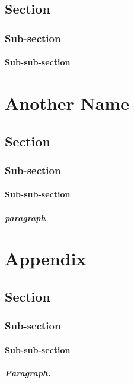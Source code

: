 \documentclass{thesis}
\begin{document}
\section{Section}
\subsection{Sub-section}
\subsubsection{Sub-sub-section}

\chapter{Another Name}
\lipsum[1-2]
\section{Section}
\lipsum[1]
\subsection{Sub-section}
\lipsum[5]
\subsubsection{Sub-sub-section}
\lipsum[1]
\paragraph{paragraph}
\lipsum[1]



\appendix %

\chapter{Appendix}
\section{Section}
\lipsum[1]
\subsection{Sub-section}
\lipsum[5]
\subsubsection{Sub-sub-section}
\lipsum[1]
\paragraph{Paragraph.}
\lipsum[1]
\end{document}
